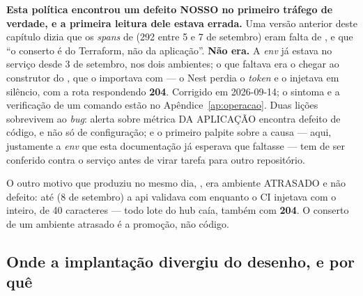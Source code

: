 \begin{atencao}
\textbf{Esta política encontrou um defeito NOSSO no primeiro tráfego de
verdade, e a primeira leitura dele estava errada.} Uma versão anterior deste
capítulo dizia que os \emph{spans}  de  (292
entre 5 e 7 de setembro) eram falta de , e que \enquote{o
conserto é do Terraform, não da aplicação}. \textbf{Não era.} A \emph{env} já
estava no serviço desde 3 de setembro, nos dois ambientes; o que faltava era o
 chegar ao construtor do , que o
importava com  --- o Nest perdia o \emph{token} e o
 injetava  em silêncio, com a rota respondendo
\textbf{204}. Corrigido em 2026-09-14; o sintoma e a verificação de um comando
estão no Apêndice~\ref{ap:operacao}. Duas lições sobrevivem ao \emph{bug}:
alerta sobre métrica DA APLICAÇÃO encontra defeito de código, e não só de
configuração; e o primeiro palpite sobre a causa --- aqui, justamente a
\emph{env} que esta documentação já esperava que faltasse --- tem de ser
conferido contra o serviço antes de virar tarefa para outro repositório.
\end{atencao}

\begin{nota}
O outro motivo que  produziu no mesmo dia, , era
ambiente ATRASADO e não defeito: até  (8 de setembro) a api validava
 com  enquanto o CI injetava
 com o  inteiro, de 40 caracteres
--- todo lote do hub caía, também com \textbf{204}. O conserto de um ambiente
atrasado é a promoção, não código.
\end{nota}

\subsection{Onde a implantação divergiu do desenho, e por quê}


